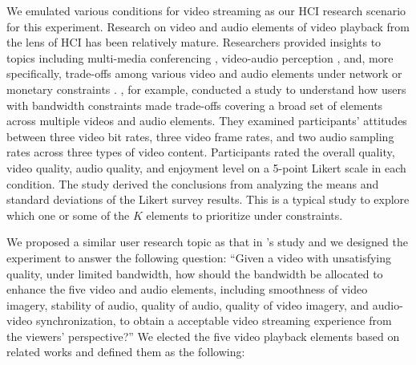 We emulated various conditions for video streaming as our HCI research scenario for this experiment. Research on video and audio elements of video playback from the lens of HCI has been relatively mature. Researchers provided insights to topics including multi-media conferencing \cite{watson1996evaluating}, video-audio perception \cite{chen2006cognitive, molnar2015assessing}, and, more specifically, trade-offs among various video and audio elements under network or monetary constraints \cite{molnar2013comedy, oeldorf2012bad}. \textcite{oeldorf2012bad}, for example, conducted a study to understand how users with bandwidth constraints made trade-offs covering a broad set of elements across multiple videos and audio elements. They examined participants' attitudes between three video bit rates, three video frame rates, and two audio sampling rates across three types of video content. Participants rated the overall quality, video quality, audio quality, and enjoyment level on a 5-point Likert scale in each condition. The study derived the conclusions from analyzing the means and standard deviations of the Likert survey results. This is a typical study to explore which one or some of the $K$ elements to prioritize under constraints.

We proposed a similar user research topic as that in \textcite{oeldorf2012bad}'s study and we designed the experiment to answer the following question: ``Given a video with unsatisfying quality, under limited bandwidth, how should the bandwidth be allocated to enhance the five video and audio elements, including smoothness of video imagery, stability of audio, quality of audio, quality of video imagery, and audio-video synchronization, to obtain a acceptable video streaming experience from the viewers' perspective?'' We elected the five video playback elements based on related works and defined them as the following: 

